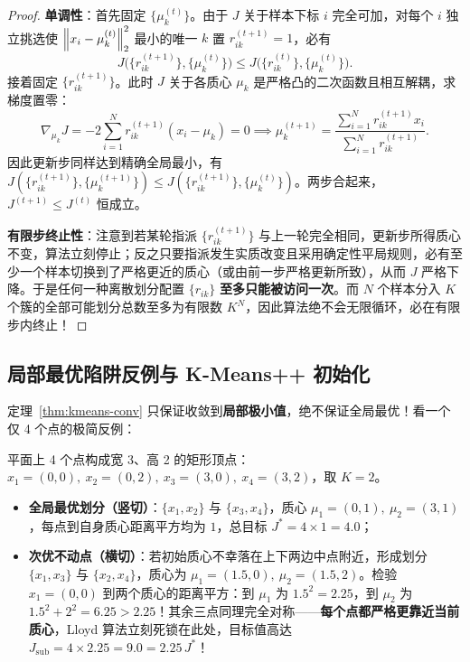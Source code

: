 \begin{proof}
\textbf{单调性}：首先固定 $\{\mu_k^{(t)}\}$。由于 $J$ 关于样本下标 $i$ 完全可加，对每个 $i$ 独立挑选使 $\left\|x_i - \mu_k^{(t)}\right\|_2^2$ 最小的唯一 $k$ 置 $r_{ik}^{(t+1)} = 1$，必有
\[
  J\big(\{r_{ik}^{(t+1)}\}, \{\mu_k^{(t)}\}\big) \le J\big(\{r_{ik}^{(t)}\}, \{\mu_k^{(t)}\}\big).
\]
接着固定 $\{r_{ik}^{(t+1)}\}$。此时 $J$ 关于各质心 $\mu_k$ 是严格凸的二次函数且相互解耦，求梯度置零：
\[
  \nabla_{\mu_k} J = -2 \sum_{i=1}^{N} r_{ik}^{(t+1)}(x_i - \mu_k) = 0 \implies \mu_k^{(t+1)} = \frac{\sum_{i=1}^{N} r_{ik}^{(t+1)} x_i}{\sum_{i=1}^{N} r_{ik}^{(t+1)}}.
\]
因此更新步同样达到精确全局最小，有 $J(\{r_{ik}^{(t+1)}\}, \{\mu_k^{(t+1)}\}) \le J(\{r_{ik}^{(t+1)}\}, \{\mu_k^{(t)}\})$。两步合起来，$J^{(t+1)} \le J^{(t)}$ 恒成立。

\textbf{有限步终止性}：注意到若某轮指派 $\{r_{ik}^{(t+1)}\}$ 与上一轮完全相同，更新步所得质心不变，算法立刻停止；反之只要指派发生实质改变且采用确定性平局规则，必有至少一个样本切换到了严格更近的质心（或由前一步严格更新所致），从而 $J$ 严格下降。于是任何一种离散划分配置 $\{r_{ik}\}$ \textbf{至多只能被访问一次}。而 $N$ 个样本分入 $K$ 个簇的全部可能划分总数至多为有限数 $K^N$，因此算法绝不会无限循环，必在有限步内终止！
\end{proof}

\subsection{局部最优陷阱反例与 K-Means++ 初始化}

定理~\ref{thm:kmeans-conv} 只保证收敛到\textbf{局部极小值}，绝不保证全局最优！看一个仅 4 个点的极简反例：

\begin{example}\label{ex:kmeans-localmin}
平面上 4 个点构成宽 3、高 2 的矩形顶点：$x_1=(0,0),\ x_2=(0,2),\ x_3=(3,0),\ x_4=(3,2)$，取 $K = 2$。
\begin{itemize}
  \item \textbf{全局最优划分（竖切）}：$\{x_1, x_2\}$ 与 $\{x_3, x_4\}$，质心 $\mu_1=(0,1),\ \mu_2=(3,1)$，每点到自身质心距离平方均为 $1$，总目标 $J^* = 4 \times 1 = \mathbf{4.0}$；
  \item \textbf{次优不动点（横切）}：若初始质心不幸落在上下两边中点附近，形成划分 $\{x_1, x_3\}$ 与 $\{x_2, x_4\}$，质心为 $\mu_1=(1.5, 0),\ \mu_2=(1.5, 2)$。检验 $x_1=(0,0)$ 到两个质心的距离平方：到 $\mu_1$ 为 $1.5^2 = 2.25$，到 $\mu_2$ 为 $1.5^2 + 2^2 = 6.25 > 2.25$！其余三点同理完全对称——\textbf{每个点都严格更靠近当前质心}，Lloyd 算法立刻死锁在此处，目标值高达 $J_{\mathrm{sub}} = 4 \times 2.25 = \mathbf{9.0} = 2.25\, J^*$！
\end{itemize}
\end{example}

